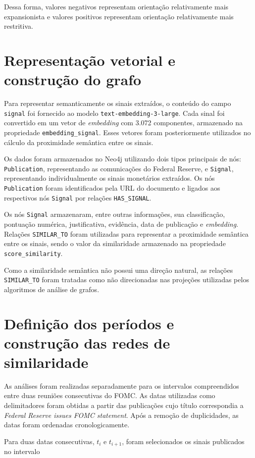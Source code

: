 Dessa forma, valores negativos representam orientação relativamente mais
expansionista e valores positivos representam orientação relativamente mais
restritiva.

\section{Representação vetorial e construção do grafo}

Para representar semanticamente os sinais extraídos, o conteúdo do campo
\texttt{signal} foi fornecido ao modelo
\texttt{text-embedding-3-large}. Cada sinal foi convertido em um vetor de
\textit{embedding} com 3.072 componentes, armazenado na propriedade
\texttt{embedding\_signal}. Esses vetores foram posteriormente utilizados no
cálculo da proximidade semântica entre os sinais.

Os dados foram armazenados no Neo4j utilizando dois tipos principais de nós:
\texttt{Publication}, representando as comunicações do Federal Reserve, e
\texttt{Signal}, representando individualmente os sinais monetários extraídos.
Os nós \texttt{Publication} foram identificados pela URL do documento e ligados
aos respectivos nós \texttt{Signal} por relações
\texttt{HAS\_SIGNAL}.

Os nós \texttt{Signal} armazenaram, entre outras informações, sua classificação,
pontuação numérica, justificativa, evidência, data de publicação e
\textit{embedding}. Relações \texttt{SIMILAR\_TO} foram utilizadas para
representar a proximidade semântica entre os sinais, sendo o valor da
similaridade armazenado na propriedade \texttt{score\_similarity}.

Como a similaridade semântica não possui uma direção natural, as relações
\texttt{SIMILAR\_TO} foram tratadas como não direcionadas nas projeções
utilizadas pelos algoritmos de análise de grafos.

\section{Definição dos períodos e construção das redes de similaridade}

As análises foram realizadas separadamente para os intervalos compreendidos
entre duas reuniões consecutivas do FOMC. As datas utilizadas como delimitadores
foram obtidas a partir das publicações cujo título correspondia a
\textit{Federal Reserve issues FOMC statement}. Após a remoção de duplicidades,
as datas foram ordenadas cronologicamente.

Para duas datas consecutivas, $t_i$ e $t_{i+1}$, foram selecionados os sinais
publicados no intervalo

